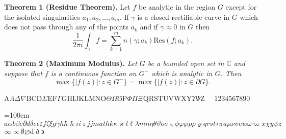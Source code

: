 \documentclass{article}
\begin{document}
\pagestyle{empty}

\textbf{Theorem 1 (Residue Theorem).}
Let $f$ be analytic in the region $G$ except for the isolated singularities $a_1,a_2,\ldots,a_m$. If $\gamma$ is a closed rectifiable curve in $G$ which does not pass through any of the points $a_k$ and if $\gamma\approx 0$ in $G$ then
\[
\frac{1}{2\pi i}\int_\gamma f = \sum_{k=1}^m n(\gamma;a_k) \text{Res}(f;a_k).
\]

\textbf{Theorem 2 (Maximum Modulus).}
\emph{Let $G$ be a bounded open set in $\mathbb{C}$ and suppose that $f$ is a continuous function on $G^-$ which is analytic in $G$. Then}
\[
\max\{|f(z)|:z\in G^-\}=\max \{|f(z)|:z\in \partial G \}.
\]
\vspace*{-1em}

\newcommand{\abc}{abcdefghijklmnopqrstuvwxyz}
\newcommand{\ABC}{ABCDEFGHIJKLMNOPQRSTUVWXYZ}
\newcommand{\alphabeta}{\alpha\beta\gamma\delta\epsilon\varepsilon\zeta\eta\theta\vartheta\iota\kappa\varkappa\lambda\mu\nu\xi o\pi\varpi\rho\varrho\sigma\varsigma\tau\upsilon\phi\varphi\chi\psi\omega}
\newcommand{\AlphaBeta}{\Gamma\Delta\Theta\Lambda\Xi\Pi\Sigma\Upsilon\Phi\Psi\Omega}




$\mathrm{A} \Lambda \Delta \nabla \mathrm{B C D} \Sigma \mathrm{E F} \Gamma \mathrm{G H I J K L M N O} \Theta \Omega \mho \mathrm{P} \Phi \Pi \Xi \mathrm{Q R S T U V W X Y} \Upsilon \Psi \mathrm{Z} $  $ \quad 1234567890 $


{\par {} \emergencystretch=100em $a\alpha b \beta c \partial d \delta e \epsilon \varepsilon f \zeta \xi g \gamma h \hbar \hslash \iota i \imath j jmath k \kappa \varkappa l \ell \lambda m n \eta \theta \vartheta o \sigma \varsigma \phi \varphi \wp p \rho \varrho q r s t \tau \pi u \mu \nu v \upsilon w \omega \varpi x \chi y \psi z$ \linebreak[3] $\infty \propto \emptyset \varnothing \mathrm{d}\eth \backepsilon$\par}


\end{document}
